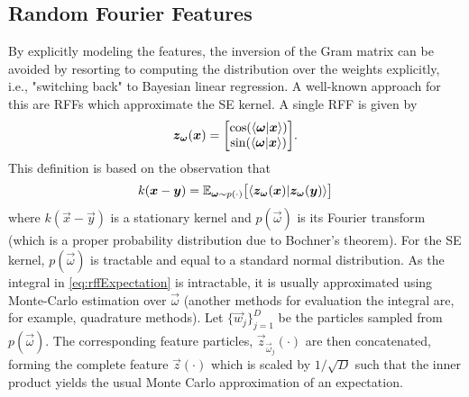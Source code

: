\subsection{Random Fourier Features}
	By explicitly modeling the features, the inversion of the Gram matrix can be avoided by resorting to computing the distribution over the weights explicitly, i.e., "switching back" to Bayesian linear regression.
	A well-known approach for this are \acp{RFF}\cite{rahimiRandomFeaturesLargeScale2007} which approximate the \ac{SE} kernel.
	A single \ac{RFF} is given by
	\begin{equation}
		\vec{z}_{\vec{\omega}}(\vec{x}) =
			\begin{bmatrix}
				\cos(\ip{\vec{\omega}}{\vec{x}}) \\
				\sin(\ip{\vec{\omega}}{\vec{x}})
			\end{bmatrix}\!.
		\label{eq:rffFeature}
	\end{equation}
	This definition is based on the observation that
	\begin{equation}
		k(\vec{x} - \vec{y}) = \E_{\vec{\omega} \sim p(\cdot)}\bigl[ \ip{\vec{z}_{\vec{\omega}}(\vec{x})}{\vec{z}_{\vec{\omega}}(\vec{y})} \bigr]
		\label{eq:rffExpectation}
	\end{equation}
	where $k(\vec{x} - \vec{y})$ is a stationary kernel and $p(\vec{\omega})$ is its Fourier transform (which is a proper probability distribution due to Bochner's theorem\cite{steinInterpolationSpatialData1999}).
	For the \ac{SE} kernel, $p(\vec{\omega})$ is tractable and equal to a standard normal distribution\cite{rasmussenGaussianProcessesMachine2006}.
	As the integral in \cref{eq:rffExpectation} is intractable, it is usually approximated using Monte-Carlo estimation over $\vec{\omega}$ (another methods for evaluation the integral are, for example, quadrature methods\cite{daoGaussianQuadratureKernel2017}).
	Let $\{ \vec{w}_j \}_{j = 1}^{D}$ be the particles sampled from $p(\vec{\omega})$.
	The corresponding feature particles, $\vec{z}_{\vec{\omega}_j}(\cdot)$ are then concatenated, forming the complete feature $\vec{z}(\cdot)$ which is scaled by $1/\sqrt{D}$ such that the inner product yields the usual Monte Carlo approximation of an expectation.

